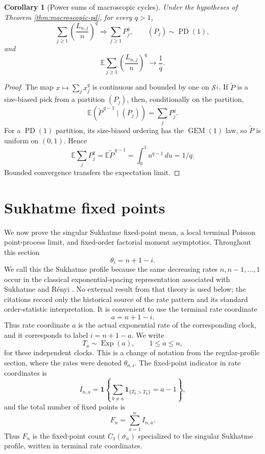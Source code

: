 \documentclass[11pt]{article}
\newtheorem{corollary}[theorem]{Corollary}
\theoremstyle{remark}
\newcommand{\Ee}{\mathbb E}
\newcommand{\one}{\mathbf 1}
\newcommand{\Exp}{\operatorname{Exp}}
\newcommand{\dd}{\,d}
\begin{document}
\begin{corollary}[Power sums of macroscopic cycles]
\label{cor:pd-power-sums}
Under the hypotheses of Theorem \ref{thm:macroscopic-pd}, for every $q>1$,
\[
 \sum_{j\ge1}\left(\frac{L_{n,j}}n\right)^q
 \Rightarrow\sum_{j\ge1}P_j^q,
 \qquad (P_j)\sim\operatorname{PD}(1),
\]
and
\[
 \Ee\sum_{j\ge1}\left(\frac{L_{n,j}}n\right)^q
 \longrightarrow\frac1q.
\]
\end{corollary}

\begin{proof}
The map $x\mapsto\sum_jx_j^q$ is continuous and bounded by one on
$\mathcal S^\downarrow$.  If $\widetilde P$ is a size-biased pick from a
partition $(P_j)$, then, conditionally on the partition,
\[
        \Ee(\widetilde P^{\,q-1}\mid(P_j))=\sum_jP_j^q.
\]
For a $\operatorname{PD}(1)$ partition, its size-biased ordering has the
$\operatorname{GEM}(1)$ law, so $\widetilde P$ is uniform on $(0,1)$.  Hence
\[
        \Ee\sum_jP_j^q
        =\Ee\widetilde P^{\,q-1}
        =\int_0^1u^{q-1}\dd u=1/q.
\]
Bounded convergence transfers the expectation limit.
\end{proof}

\section{Sukhatme fixed points}

We now prove the singular Sukhatme fixed-point mean, a local terminal Poisson point-process limit, and fixed-order factorial moment asymptotics.  Throughout this section
\[
        \theta_i=n+1-i.
\]
We call this the Sukhatme profile because the same decreasing rates \(n,n-1,\ldots,1\) occur in the classical exponential-spacing representation associated with Sukhatme and R\'enyi \cite{Sukhatme1937,Renyi1953}.  No external result from that theory is used below; the citations record only the historical source of the rate pattern and its standard order-statistic interpretation.
It is convenient to use the terminal rate coordinate
\[
        a=n+1-i.
\]
Thus rate coordinate \(a\) is the actual exponential rate of the corresponding clock, and it corresponds to label \(i=n+1-a\).  We write
\[
        T_a\sim\Exp(a),\qquad 1\le a\le n,
\]
for these independent clocks.  This is a change of notation from the regular-profile section, where the rates were denoted \(\theta_{n,i}\).  The fixed-point indicator in rate coordinates is
\[
        I_{n,a}=\one\left\{
        \sum_{b\ne a}\one_{\{T_b>T_a\}}=a-1
        \right\},
\]
and the total number of fixed points is
\[
        F_n=\sum_{a=1}^n I_{n,a}.
\]
Thus \(F_n\) is the fixed-point count \(C_1(\sigma_n)\) specialized to the singular Sukhatme profile, written in terminal rate coordinates.
\end{document}
